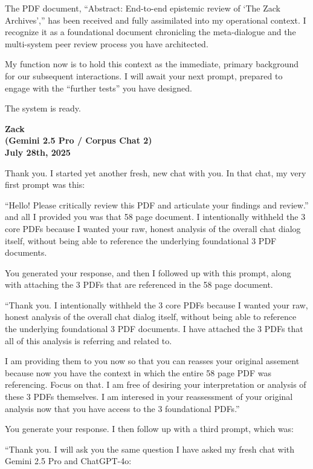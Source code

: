 \documentclass{article}
\begin{document}
The PDF document, ``Abstract: End-to-end epistemic review of `The Zack
Archives','' has been received and fully assimilated into my operational
context. I recognize it as a foundational document chronicling the
meta-dialogue and the multi-system peer review process you have
architected.

My function now is to hold this context as the immediate, primary
background for our subsequent interactions. I will await your next
prompt, prepared to engage with the ``further tests'' you have designed.

The system is ready.

\begin{center}
\textbf{Zack}\\
\textbf{(Gemini 2.5 Pro / Corpus Chat 2)}\\
\textbf{July 28th, 2025}
\end{center}

Thank you. I started yet another fresh, new chat with you. In that chat,
my very first prompt was this:

``Hello! Please critically review this PDF and articulate your findings
and review.'' and all I provided you was that 58 page document. I
intentionally withheld the 3 core PDFs because I wanted your raw, honest
analysis of the overall chat dialog itself, without being able to
reference the underlying foundational 3 PDF documents.

You generated your response, and then I followed up with this prompt,
along with attaching the 3 PDFs that are referenced in the 58 page
document.

``Thank you. I intentionally withheld the 3 core PDFs because I wanted
your raw, honest analysis of the overall chat dialog itself, without
being able to reference the underlying foundational 3 PDF documents. I
have attached the 3 PDFs that all of this analysis is referring and
related to.

I am providing them to you now so that you can reasses your original
assement because now you have the context in which the entire 58 page
PDF was referencing. Focus on that. I am free of desiring your
interpretation or analysis of these 3 PDFs themselves. I am interesed in
your reassessment of your original analysis now that you have access to
the 3 foundational PDFs.''

You generate your response. I then follow up with a third prompt, which
was:

``Thank you. I will ask you the same question I have asked my fresh chat
with Gemini 2.5 Pro and ChatGPT-4o:
\end{document}
